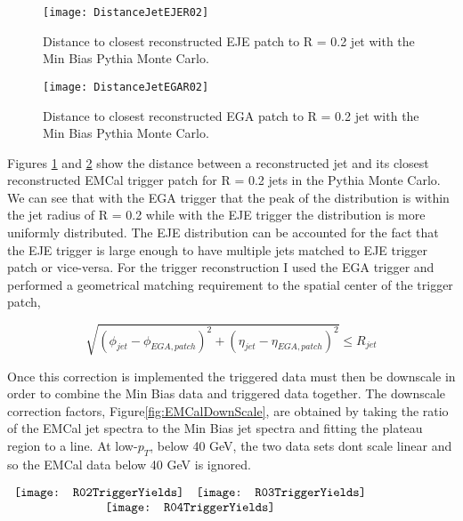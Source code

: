 \begin{figure}[h]
\texttt{[image: DistanceJetEJER02]}
\centering
\caption{Distance to closest reconstructed EJE patch to R = 0.2 jet with the Min Bias Pythia Monte Carlo.}
\label{fig:DisJetEJE}
\end{figure}

\begin{figure}[h]
\texttt{[image: DistanceJetEGAR02]}
\centering
\caption{Distance to closest reconstructed EGA patch to R = 0.2 jet with the Min Bias Pythia Monte Carlo.}
\label{fig:DisJetEGA}
\end{figure}

\noindent
Figures \ref{fig:DisJetEJE} and \ref{fig:DisJetEGA} show the distance between a reconstructed jet and its closest reconstructed EMCal trigger patch for R = 0.2 jets in the Pythia Monte Carlo.  We can see that with the EGA trigger that the peak of the distribution is within the jet radius of R = 0.2 while with the EJE trigger the distribution is more uniformly distributed.  The EJE distribution can be accounted for the fact that the EJE trigger is large enough to have multiple jets matched to EJE trigger patch or vice-versa.  For the trigger reconstruction I used the EGA trigger and performed a geometrical matching requirement to the spatial center of the trigger patch,

\begin{equation}
\sqrt{ ( \phi_{jet} - \phi_{EGA, patch} )^{2} + ( \eta_{jet} - \eta_{EGA, patch} )^{2}}  \leq R_{jet} 
\label{eq:triggermatch}
\end{equation}

\noindent
Once this correction is implemented the triggered data must then be downscale in order to combine the Min Bias data and triggered data together.  The downscale correction factors, Figure\ref{fig:EMCalDownScale}, are obtained by taking the ratio of the EMCal jet spectra to the Min Bias jet spectra and fitting the plateau region to a line.  At low-$p_{T}$, below 40 GeV,  the two data sets dont scale linear and so the EMCal data below 40 GeV is ignored.


\begin{figure*}[t!]
$\begin{array}{rl}
    \texttt{[image: R02TriggerYields]} &
    \texttt{[image: R03TriggerYields]}\\
    \multicolumn{2}{c}{\texttt{[image: R04TriggerYields]}}
\end{array}$
\caption[EMCal triggered data correction factors for R=0.2, R=0.3, and R=0.4 jets.]{\label{fig:EMCalDownScale}EMCal triggered data correction factors for R=0.2, R=0.3, and R=0.4 jets.}
\end{figure*}

